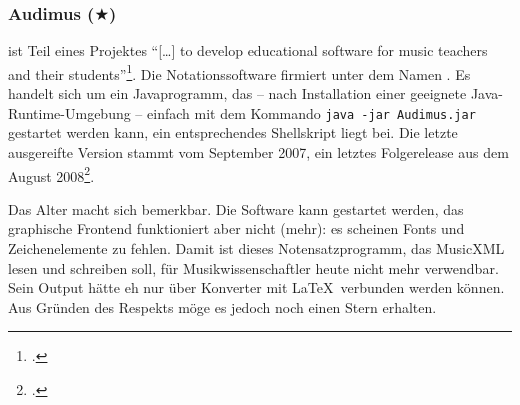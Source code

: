 %
%
%



\subsubsection{Audimus ($\bigstar$)}

\label{Audimus} ist Teil eines Projektes \enquote{[\ldots] to
develop educational software for music teachers and their
students}\footcite[vgl.][\nopage wp]{Audimus2008a}. Die Notationssoftware
firmiert unter dem Namen . Es handelt sich um ein
Javaprogramm, das -- nach Installation einer geeignete Java-Runtime-Umgebung --
einfach mit dem Kommando \texttt{java -jar Audimus.jar} gestartet werden kann,
ein entsprechendes Shellskript liegt bei. Die letzte ausgereifte Version stammt
vom September 2007, ein letztes Folgerelease aus dem August
2008\footcite[vgl.][\nopage wp]{Audimus2008b}.

Das Alter macht sich bemerkbar. Die Software kann gestartet werden, das
graphische Frontend funktioniert aber nicht (mehr): es scheinen Fonts und
Zeichenelemente zu fehlen. Damit ist dieses Notensatzprogramm, das MusicXML
lesen und schreiben soll, für Musikwissenschaftler heute nicht mehr verwendbar.
Sein Output hätte eh nur über Konverter mit \LaTeX\ verbunden werden können. Aus
Gründen des Respekts möge es jedoch noch einen Stern erhalten.



%
